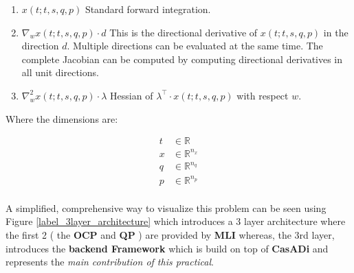 \documentclass[12pt, letterpaper]{article}
\begin{document}
\begin{enumerate}[label=\textbf{S.\arabic*}]  
\item \label{label_forward_integration} \boldmath$x(t;t,s,q,p)$
        Standard forward integration.
  \item \label{label_directional_derivative} \boldmath$\nabla_{w} x(t;t,s,q,p)\cdot d$
        This is the directional derivative of $x(t;t,s,q,p)$ in the direction $d$. Multiple directions can be evaluated at the same time. The complete Jacobian can be computed by computing directional derivatives in all unit directions.
  \item \label{label_Hessian} \boldmath$\nabla^2_{w} x(t;t,s,q,p) \cdot \lambda$
        Hessian of $\lambda^\top \cdot x(t;t,s,q,p)$ with respect $w$.
\end{enumerate}

Where the dimensions are:

\begin{subequations}
\begin{align}
  t &\in \mathbb{R}                \\
  x &\in \mathbb{R}^{n_x}         \\
  q &\in \mathbb{R}^{n_q}         \\
  p &\in \mathbb{R}^{n_p}         \\
\end{align}
\end{subequations}

A simplified, comprehensive way to visualize this problem can be seen using Figure \ref{label_3layer_architecture} which introduces a 3 layer architecture where the first 2 ( the \textbf{OCP} and \textbf{QP} ) are provided by \textbf{MLI} whereas, the 3rd layer, introduces the \textbf{backend Framework} which is build on top of \textbf{CasADi} and represents the \textit{main contribution of this practical}. \\
\end{document}
